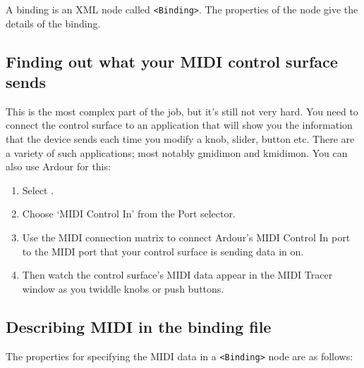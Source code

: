 \documentclass[10pt,a4paper]{book}
\newcommand{\menu}[1]{\emph{\StrSubstitute{#1}{,}{ $\rightarrow$ }}}
\begin{document}
{A binding is an XML node called \texttt{<Binding>}.  The properties of the
node give the details of the binding.  



\subsection{Finding out what your MIDI control surface sends}

This is the most complex part of the job, but it's still not very hard.
You need to connect the control surface to an application that will
show you the information that the device sends each time you modify a
knob, slider, button etc.  There are a variety of such applications;
most notably gmidimon and kmidimon.  You can also use Ardour for this:

\begin{enumerate}
\item Select \menu{Window,MIDI Tracer}.
\item Choose `MIDI Control In' from the Port selector.
\item Use the MIDI connection matrix to connect Ardour's
MIDI Control In port to the MIDI port that your control surface is
sending data in on.
\item Then watch the control surface's MIDI data appear
in the MIDI Tracer window as you twiddle knobs or push buttons.
\end{enumerate}


\subsection{Describing MIDI in the binding file}

The properties for specifying the MIDI data in a \texttt{<Binding>}
node are as follows:

}
\end{document}
